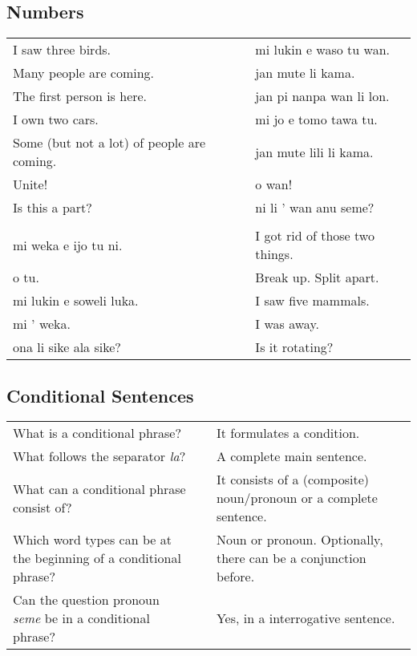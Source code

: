 \subsection*{Numbers} 
\label{'numbers'}
%
\begin{supertabular}{p{5,5cm}|ll}
I saw three birds.  && mi lukin e waso tu wan. \\ %
Many people are coming.  && jan mute li kama. \\ %
The first person is here.  && jan pi nanpa wan li lon. \\ %
I own two cars.  && mi jo e tomo tawa tu. \\ %
Some (but not a lot) of people are coming.  && jan mute lili li kama. \\ %
Unite!  && o wan! \\ %
Is this a part? && ni li ' wan anu seme? \\ %
 && \\ %
mi weka e ijo tu ni.  && I got rid of those two things. \\
o tu.  && Break up. Split apart. \\
mi lukin e soweli luka.  && I saw five mammals. \\
mi ' weka.  && I was away. \\
ona li sike ala sike? && Is it rotating? \\
\end{supertabular} 

\subsection*{Conditional Sentences} 
\label{'la'}
%
\begin{supertabular}{p{5,5cm}|ll}
What is a conditional phrase? && It formulates a condition. \\  %
What follows the separator \textit{la}? && A complete main sentence.  \\  %
What can a conditional phrase consist of?  && It consists of a (composite) noun/pronoun or a complete sentence. \\  %
Which word types can be at the beginning of a conditional phrase? && Noun or pronoun. Optionally, there can be a conjunction before. \\  %
Can the question pronoun \textit{seme} be in a conditional phrase? && Yes, in a interrogative sentence.  \\  %
\end{supertabular}

